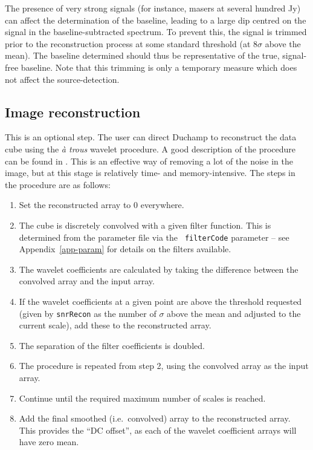 \documentclass[12pt,a4paper]{article}
\newcommand{\ie}{i.e.\ }
\begin{document}
The presence of very strong signals (for instance, masers at several
hundred Jy) can affect the determination of the baseline, leading to a
large dip centred on the signal in the baseline-subtracted
spectrum. To prevent this, the signal is trimmed prior to the
reconstruction process at some standard threshold (at $8\sigma$ above
the mean). The baseline determined should thus be representative of
the true, signal-free baseline. Note that this trimming is only a
temporary measure which does not affect the source-detection.

\subsection{Image reconstruction}
\label{sec-recon}

This is an optional step. The user can direct Duchamp to
reconstruct the data cube using the {\it {\`a} trous} wavelet
procedure. A good description of the procedure can be found in
\citet{starck02:book}. This is an effective way of removing a
lot of the noise in the image, but at this stage is relatively time-
and memory-intensive. The steps in the procedure are as follows:
\begin{enumerate}
\item Set the reconstructed array to 0 everywhere.
\item The cube is discretely convolved with a given filter
  function. This is determined from the parameter file via the {\tt
  filterCode} parameter -- see Appendix~\ref{app-param} for details on
  the filters available.
\item The wavelet coefficients are calculated by taking the difference
  between the convolved array and the input array.
\item If the wavelet coefficients at a given point are above the
  threshold requested (given by {\tt snrRecon} as the number of
  $\sigma$ above the mean and adjusted to the current scale), add
  these to the reconstructed array.
\item The separation of the filter coefficients is doubled.
\item The procedure is repeated from step 2, using the convolved array
  as the input array.
\item Continue until the required maximum number of scales is reached.
\item Add the final smoothed (\ie convolved) array to the
  reconstructed array. This provides the ``DC offset'', as each of the
  wavelet coefficient arrays will have zero mean.
\end{enumerate}
\end{document}
